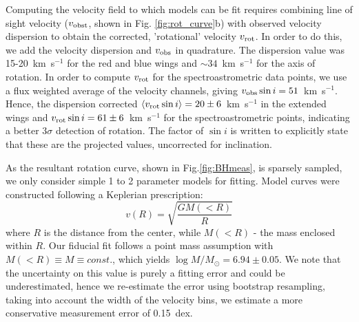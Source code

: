 \documentclass[twocolumn, fleqn]{doc_class}
\begin{document}
Computing the velocity field to which models can be fit requires combining line of sight velocity ($v_{\rm obst}$, shown in Fig. \ref{fig:rot_curve}b) with observed velocity dispersion to obtain the corrected, 'rotational' velocity $v_{\rm rot}$. In order to do this, we add the velocity dispersion and $v_{\rm obs}$ in quadrature. The dispersion value was 15-20~km~s$^{-1}$ for the red and blue wings and $\sim34$~km~s$^{-1}$ for the axis of rotation. In order to compute $v_{\rm rot}$ for the spectroastrometric data points, we use a flux weighted average of the velocity channels, giving $v_{\rm obs}\sin{i} = 51$~km~s$^{-1}$. Hence, the dispersion corrected $ \langle v_{\rm rot}\sin{i} \rangle = 20 \pm 6$~km~s$^{-1}$ in the extended wings and $v_{\rm rot}\sin{i} = 61 \pm 6$~km~s$^{-1}$ for the spectroastrometric points, indicating a better 3$\sigma$ detection of rotation. The factor of $\sin{i}$ is written to explicitly state that these are the projected values, uncorrected for inclination.

As the resultant rotation curve, shown in Fig.\ref{fig:BHmeas}, is sparsely sampled, we only consider simple 1 to 2 parameter models for fitting. Model curves were constructed following a Keplerian prescription:
\begin{equation}
\label{eq:rot_curve}
    v(R) = \sqrt{\frac{GM(<R)}{R}}
\end{equation}
where $R$ is the distance from the center, while $M(<R)$ - the mass enclosed within $R$. Our fiducial fit follows a point mass assumption with $M(<R) \equiv M \equiv const.$, which yields $\log{M/M_{\odot}} = 6.94 \pm 0.05$. We note that the uncertainty on this value is purely a fitting error and could be underestimated, hence we re-estimate the error using bootstrap resampling, taking into account the width of the velocity bins, we estimate a more conservative measurement error of 0.15~dex.
\end{document}
